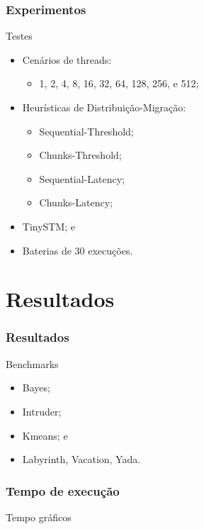 \documentclass[10pt, pdf,xcolor=pdftex,dvipsnames,table]{beamer}
\begin{document}
\begin{frame} \frametitle{Experimentos}
    \begin{block}{Testes}
        \begin{itemize}
        	\item Cenários de threads: 
            \begin{itemize}
                \item 1, 2, 4, 8, 16, 32, 64, 128, 256, e 512;
            \end{itemize}
            \item Heurísticas de Distribuição-Migração:
            \begin{itemize}
                \item Sequential-Threshold;
                \item Chunks-Threshold;
                \item Sequential-Latency;
                \item Chunks-Latency;
            \end{itemize}
            \item TinySTM; e
            \item Baterias de 30 execuções.
        \end{itemize}
    \end{block}
\end{frame}

\section{Resultados}
\begin{frame} \frametitle{Resultados}
    \begin{block}{Benchmarks}
        \begin{itemize}
        	\item Bayes;
        	\item Intruder;
        	\item Kmeans; e
        	\item Labyrinth, Vacation, Yada.
        \end{itemize}
    \end{block}
\end{frame}

\begin{frame} \frametitle{Tempo de execução}
    \begin{block}{Tempo}
        gráficos
    \end{block}
\end{frame}
\end{document}
